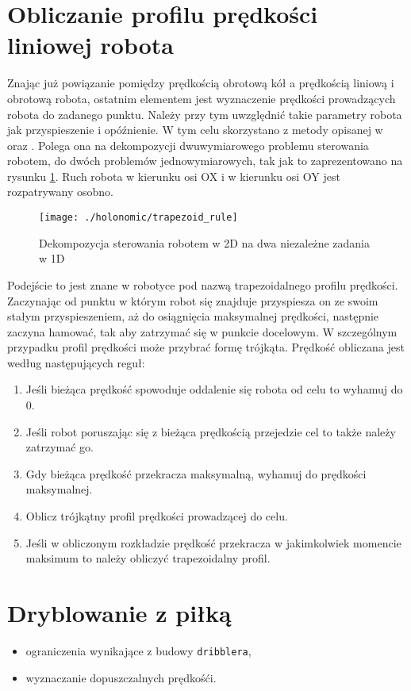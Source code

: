 \section{Obliczanie profilu prędkości liniowej robota}
Znając już powiązanie pomiędzy prędkością obrotową kół a prędkością liniową i obrotową robota, ostatnim elementem jest wyznaczenie prędkości prowadzących 
robota do zadanego punktu. Należy przy tym uwzględnić takie parametry robota jak przyspieszenie i opóźnienie. W tym celu skorzystano z metody opisanej w 
\cite{trapezy1} oraz \cite{trapezy2}. Polega ona na dekompozycji dwuwymiarowego problemu sterowania robotem, do dwóch problemów jednowymiarowych, tak jak to zaprezentowano
na rysunku \ref{fig:trapezoid_rule}. Ruch robota w kierunku osi OX i w kierunku osi OY jest rozpatrywany osobno. 
\begin{figure}[H]
\centering
\texttt{[image: ./holonomic/trapezoid\_rule]}
\caption{ Dekompozycja sterowania robotem w 2D na dwa niezależne zadania w 1D }\label{fig:trapezoid_rule}
\end{figure}
Podejście to jest znane w robotyce pod nazwą trapezoidalnego profilu prędkości.
Zaczynając od punktu w którym robot się znajduje przyspiesza on
ze swoim stałym przyspieszeniem, aż do osiągnięcia maksymalnej prędkości, następnie zaczyna hamować, tak aby zatrzymać się w punkcie docelowym.
W szczególnym przypadku profil prędkości może przybrać formę trójkąta.
Prędkość obliczana jest według następujących reguł:
\begin{enumerate}
\item Jeśli bieżąca prędkość spowoduje oddalenie się robota od celu to wyhamuj do 0.
\item Jeśli robot poruszając się z bieżąca prędkością przejedzie cel to także należy zatrzymać go.
\item Gdy bieżąca prędkość przekracza maksymalną, wyhamuj do prędkości maksymalnej.
\item Oblicz trójkątny profil prędkości prowadzącej do celu.
\item Jeśli w obliczonym rozkładzie prędkość przekracza w jakimkolwiek momencie maksimum to należy obliczyć trapezoidalny profil. 
\end{enumerate} 

\section{Dryblowanie z piłką}
\begin{itemize}
 \item ograniczenia wynikające z budowy \texttt{dribblera},
 \item wyznaczanie dopuszczalnych prędkośći.
\end{itemize}

